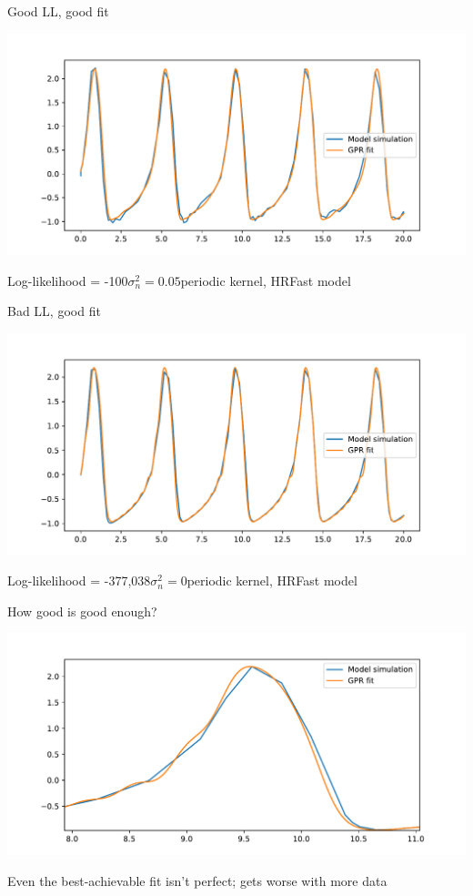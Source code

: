 \documentclass[presentation]{beamer}
\begin{document}
\begin{frame}[label={sec:org94b4652}]{Good LL, good fit}
\begin{center}
\includegraphics[width=.9\textwidth]{./HRFast_n_n.pdf}
\end{center}

Log-likelihood = -100\hfill \(\sigma_n^2=0.05\)\hfill periodic kernel, HRFast model
\end{frame}

\begin{frame}[label={sec:orgb1a475c}]{Bad LL, good fit}
\begin{center}
\includegraphics[width=.9\textwidth]{./HRFast_noise_clean.pdf}
\end{center}

Log-likelihood = -377,038\hfill \(\sigma_n^2 = 0\)\hfill periodic kernel, HRFast model
\end{frame}

\begin{frame}[label={sec:org958b550}]{How good is good enough?}
\begin{center}
\includegraphics[width=.9\textwidth]{./wiggles.pdf}
\end{center}

Even the best-achievable fit isn't perfect; gets worse with more data
\end{frame}
\end{document}
